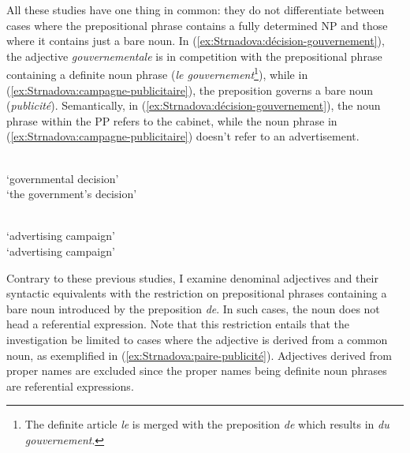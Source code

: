 \documentclass[output=paper]{LSP/langsci}
\begin{document}
\begin{exe}
\ex \begin{xlist}  \label{ex:Strnadova:accord français}
\end{xlist}
\end{exe}


All these studies have one thing in common: they do not differentiate between cases where the prepositional phrase contains a fully determined NP and those where it contains just a bare noun. In (\ref{ex:Strnadova:décision-gouvernement}), the adjective \emph{gouvernementale}  is in competition with the prepositional phrase containing a definite noun phrase (\emph{le gouvernement}\footnote{The definite article \emph{le} is merged with the preposition \emph{de} which results in \emph{du gouvernement}.}), while in (\ref{ex:Strnadova:campagne-publicitaire}), the preposition governs a bare noun (\emph{publicité}). Semantically, in (\ref{ex:Strnadova:décision-gouvernement}), the noun phrase within the PP refers to the cabinet, while the noun phrase in (\ref{ex:Strnadova:campagne-publicitaire}) doesn't refer to an advertisement.

 
\begin{exe}
\ex \begin{xlist} \label{ex:Strnadova:décision-gouvernement}
	\\  `governmental decision'
	\\ `the government's decision'
	\end{xlist}
\ex  \begin{xlist} \label{ex:Strnadova:campagne-publicitaire}
	\\ `advertising campaign'
	\\ `advertising campaign'
	\end{xlist}
\end{exe}

Contrary to these previous studies, I examine denominal adjectives and their syntactic equivalents with the restriction on prepositional phrases containing a bare noun introduced by the preposition \emph{de}. In such cases, the noun does not head a referential expression. Note that this restriction entails that the investigation be limited to cases where the adjective is derived from a common noun, as exemplified in (\ref{ex:Strnadova:paire-publicité}). Adjectives derived from proper names are excluded   since the proper names being definite noun phrases are referential expressions.
\end{document}
